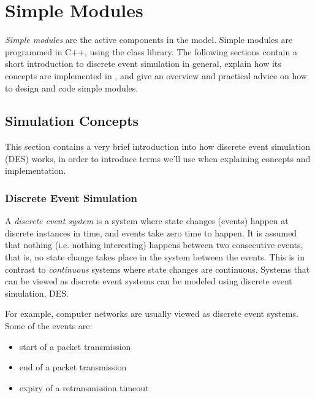 \chapter{Simple Modules}
\label{cha:simple-modules}


\textit{Simple modules} are the active components in the model.
Simple modules are programmed in C++, using the {\opp} class
library. The following sections contain a short introduction
to discrete event simulation in general, explain how its concepts are
implemented in {\opp}, and give an overview and practical advice
on how to design and code simple modules.



\section{Simulation Concepts}
\label{sec:simple-modules:simulation-concepts}

This section contains a very brief introduction into how discrete
event simulation (DES) works, in order to introduce terms we'll use
when explaining {\opp} concepts and
implementation.


\subsection{Discrete Event Simulation}
\label{sec:simple-modules:discrete-event-simulation}

A \textit{discrete event system} is a system where state changes
(events) happen at discrete instances in time, and events take zero time
to happen. It is assumed that nothing (i.e. nothing interesting)
happens between two consecutive events, that is, no state change takes
place in the system between the events. This is in contrast to
\textit{continuous} systems where state changes are continuous.
Systems that can be viewed as discrete event systems can be modeled
using discrete event simulation, DES.

For example, computer networks are usually viewed as discrete
event systems. Some of the events are:

\begin{itemize}
  \item{start of a packet transmission}
  \item{end of a packet transmission}
  \item{expiry of a retransmission timeout}
\end{itemize}

